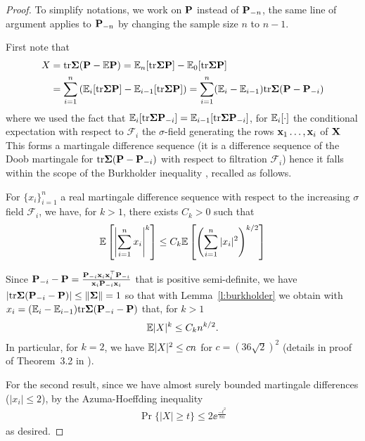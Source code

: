\documentclass[11pt]{article}
\begin{document}
\begin{proof}
To simplify notations, we work on $\P$ instead of $\P_{-n}$, the same line of argument applies to $\P_{-n}$ by changing the sample size $n$ to $n-1$.

First note that
\begin{align*}
  X
  &= \tr \Sigmab (\P - \E \P)
  = \E_n [\tr \Sigmab \P]  - \E_0[ \tr \Sigmab \P ]\\
  &= \sum_{i=1}^n \left( \E_i[\tr \Sigmab \P] - \E_{i-1}[\tr \Sigmab \P]\right)
  = \sum_{i=1}^n (\E_i - \E_{i-1}) \tr \Sigmab (\P - \P_{-i})
\end{align*}
where we used the fact that $\E_i [\tr \Sigmab \P_{-i}] = \E_{i-1} [\tr \Sigmab \P_{-i}]$, for $\E_i[\cdot]$ the conditional expectation with respect to $\mathcal F_i$ the $\sigma$-field generating the rows $\x_1 \ldots, \x_i$ of $\X$
This forms a martingale difference sequence (it is a difference sequence of
the Doob martingale for $\tr \Sigmab (\P - \P_{-i})$ with respect to filtration $\mathcal{F}_i$)
hence it falls within the scope of the Burkholder inequality \cite{burkholder1973distribution}, recalled as follows.

\begin{lemma}\label{l:burkholder}
For $\{ x_i \}_{i=1}^n$ a real martingale difference sequence with respect to the increasing $\sigma$ field $\mathcal F_i$, we have, for $k > 1$, there exists $C_k > 0$ such that
\[
  \E \left[
    \left| \sum_{i=1}^n x_i \right|^k
  \right]
  \le C_k \E \left[
    \left( \sum_{i=1}^n |x_i|^2 \right)^{k/2}
  \right]
\]
\end{lemma}

Since $\P_{-i} - \P = \frac{\P_{-i} \x_i \x_i^\top \P_{-i} }{ \x_i \P_{-i} \x_i}$ that is positive semi-definite, we have $|\tr \Sigmab (\P_{-i} - \P)| \le \| \Sigmab \| = 1$ so that with Lemma~\ref{l:burkholder} we obtain with $x_i = (\E_i - \E_{i-1}) \tr \Sigmab (\P_{-i} - \P)$ that, for $k > 1$
\[
  \E |X|^k \le C_k n^{k/2}.
\]
In particular, for $k=2$, we have $\E |X|^2 \le c n$ for $c = (36 \sqrt{2})^2$
(details in proof of Theorem~3.2 in \cite{burkholder1973distribution}).

For the second result, since we have almost surely bounded martingale differences
($\lvert x_i \rvert \leq 2$), by the Azuma-Hoeffding inequality
\begin{align*}
  \Pr\{
    \lvert X \rvert
    \geq t
  \}
  \leq 2 \ee^{\frac{-t^2}{8 n}}
\end{align*}
as desired.

\end{proof}
\end{document}
